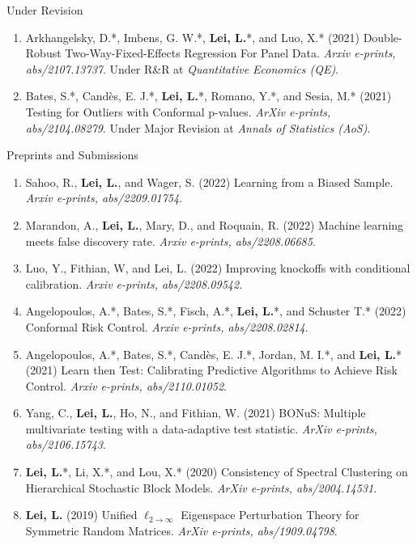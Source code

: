 \documentclass{article}
\begin{document}
\begin{large}
\noindent Under Revision
\end{large}

\begin{enumerate}
\item Arkhangelsky, D.*, Imbens, G. W.*, \textbf{Lei, L.}*, and Luo, X.* (2021) Double-Robust Two-Way-Fixed-Effects Regression For Panel Data. \emph{Arxiv e-prints, abs/2107.13737}. Under R\&R at \emph{Quantitative Economics (QE)}.
\item Bates, S.*, Cand\`{e}s, E. J.*, \textbf{Lei, L.}*, Romano, Y.*, and Sesia, M.* (2021) Testing for Outliers with Conformal p-values. \emph{ArXiv e-prints, abs/2104.08279}. Under Major Revision at \emph{Annals of Statistics (AoS)}.
\end{enumerate}

\begin{large}
\noindent Preprints and Submissions
\end{large}

\begin{enumerate}
\item Sahoo, R., \textbf{Lei, L.}, and Wager, S. (2022) Learning from a Biased Sample. \emph{Arxiv e-prints, abs/2209.01754}.
\item Marandon, A., \textbf{Lei, L.}, Mary, D., and Roquain, R. (2022) Machine learning meets false discovery rate. \emph{Arxiv e-prints, abs/2208.06685}.
\item Luo, Y., Fithian, W, and Lei, L. (2022) Improving knockoffs with conditional calibration. \emph{Arxiv e-prints, abs/2208.09542}.
\item Angelopoulos, A.*, Bates, S.*, Fisch, A.*, \textbf{Lei, L.}*, and Schuster T.* (2022) Conformal Risk Control. \emph{Arxiv e-prints, abs/2208.02814}.
\item Angelopoulos, A.*, Bates, S.*, Cand\`{e}s, E. J.*, Jordan, M. I.*, and \textbf{Lei, L.}* (2021) Learn then Test: Calibrating Predictive Algorithms to Achieve Risk Control. \emph{Arxiv e-prints, abs/2110.01052}.
\item Yang, C., \textbf{Lei, L.}, Ho, N., and Fithian, W. (2021) BONuS: Multiple multivariate testing with a data-adaptive test statistic. \emph{ArXiv e-prints, abs/2106.15743}.
\item \textbf{Lei, L.}*, Li, X.*, and Lou, X.* (2020) Consistency of Spectral Clustering on Hierarchical Stochastic Block Models. \emph{ArXiv e-prints, abs/2004.14531}.
\item \textbf{Lei, L.} (2019) Unified $\ell_{2\rightarrow\infty}$ Eigenspace Perturbation Theory for Symmetric Random Matrices. \emph{ArXiv e-prints, abs/1909.04798}.
\end{enumerate}
\end{document}
